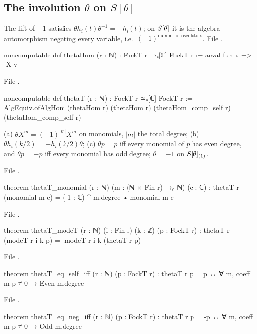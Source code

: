 \subsection{The involution \texorpdfstring{$\theta$}{theta} on \texorpdfstring{$S[\theta]$}{S[theta]}}

The lift of $-1$ satisfies $\theta h_i(t)\theta^{-1}=-h_i(t)$; on $S[\theta]$ it is the algebra
automorphism negating every variable, i.e.\ $(-1)^{\text{number of oscillators}}$.
\noindent File .
\begin{leancode}
noncomputable def thetaHom (r : ℕ) : FockT r →ₐ[ℂ] FockT r := aeval fun v => -X v
\end{leancode}
\noindent File .
\begin{leancode}
noncomputable def thetaT (r : ℕ) : FockT r ≃ₐ[ℂ] FockT r :=
  AlgEquiv.ofAlgHom (thetaHom r) (thetaHom r) (thetaHom_comp_self r) (thetaHom_comp_self r)
\end{leancode}
\begin{theorem}\label{ch06:thm:thetaT}
(a) $\theta X^m=(-1)^{|m|}X^m$ on monomials, $|m|$ the total degree;
(b) $\theta h_i(k/2)=-h_i(k/2)\theta$;
(c) $\theta p=p$ iff every monomial of $p$ has even degree, and $\theta p=-p$ iff every monomial has
odd degree; $\theta=-1$ on $S[\theta]_{(1)}$.
\end{theorem}
\noindent File .
\begin{leancode}
theorem thetaT_monomial (r : ℕ) (m : (ℕ × Fin r) →₀ ℕ) (c : ℂ) :
    thetaT r (monomial m c) = (-1 : ℂ) ^ m.degree • monomial m c
\end{leancode}
\noindent File .
\begin{leancode}
theorem thetaT_modeT (r : ℕ) (i : Fin r) (k : ℤ) (p : FockT r) :
    thetaT r (modeT r i k p) = -modeT r i k (thetaT r p)
\end{leancode}
\noindent File .
\begin{leancode}
theorem thetaT_eq_self_iff (r : ℕ) (p : FockT r) :
    thetaT r p = p ↔ ∀ m, coeff m p ≠ 0 → Even m.degree
\end{leancode}
\noindent File .
\begin{leancode}
theorem thetaT_eq_neg_iff (r : ℕ) (p : FockT r) :
    thetaT r p = -p ↔ ∀ m, coeff m p ≠ 0 → Odd m.degree
\end{leancode}

